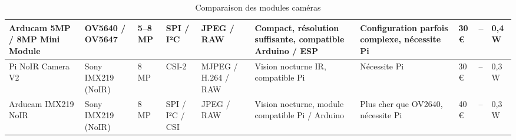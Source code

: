 \begin{table}
{{{\begin{tabular}{|P{2.2cm}|P{2.5cm}|P{2.2cm}|P{2cm}|P{2cm}|P{2.8cm}|P{2.4cm}|P{2cm}|P{1.5cm}|P{1.5cm}|}
                    \hline
                    Arducam 5MP / 8MP Mini Module & OV5640 / OV5647          & 5–8 MP                    & SPI / I²C          & JPEG / RAW          & Compact, résolution suffisante, compatible Arduino / ESP & Configuration parfois complexe, nécessite Pi & 30 € & --   & 0,4 W  \\
                    \hline
                    Pi NoIR Camera V2             & Sony IMX219 (NoIR)       & 8 MP                      & CSI-2              & MJPEG / H.264 / RAW & Vision nocturne IR, compatible Pi                        & Nécessite Pi                                 & 30 € & --   & 0,3 W  \\
                    \hline
                    Arducam IMX219 NoIR           & Sony IMX219 (NoIR)       & 8 MP                      & SPI / I²C / CSI    & JPEG / RAW          & Vision nocturne, module compatible Pi / Arduino          & Plus cher que OV2640, nécessite Pi           & 40 € & --   & 0,3 W  \\
                    \hline
                \end{tabular}
            }%
        }%
        \caption{Comparaison des modules caméras}
    }%
\end{table}

